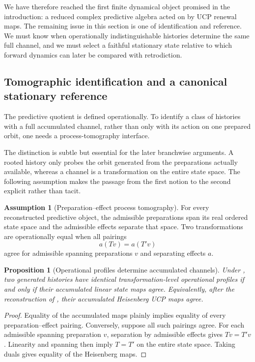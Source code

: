\documentclass[11pt]{article}
\newtheorem{proposition}[theorem]{Proposition}
\theoremstyle{definition}
\newtheorem{assumption}{Assumption}[section]
\theoremstyle{remark}
\begin{document}
We have therefore reached the first finite dynamical object promised in the
introduction: a reduced complex predictive algebra acted on by UCP renewal maps.
The remaining issue in this section is one of identification and reference.  We
must know when operationally indistinguishable histories determine the same full
channel, and we must select a faithful stationary state relative to which forward
dynamics can later be compared with retrodiction.

\subsection{Tomographic identification and a canonical stationary reference}

The predictive quotient is defined operationally.  To identify a class of
histories with a full accumulated channel, rather than only with its action on
one prepared orbit, one needs a process-tomography interface.

The distinction is subtle but essential for the later branchwise arguments.  A
rooted history only probes the orbit generated from the preparations actually
available, whereas a channel is a transformation on the entire state space.  The
following assumption makes the passage from the first notion to the second
explicit rather than tacit.

\begin{assumption}[Preparation--effect process tomography]
\label{ass:process-tomography}
For every reconstructed predictive object, the admissible preparations span
its real ordered state space and the admissible effects separate that space.
Two transformations are operationally equal when all pairings
\[
 a(Tv)=a(T'v)
\]
agree for admissible spanning preparations $v$ and separating effects $a$.
\end{assumption}

\begin{proposition}[Operational profiles determine accumulated channels]
\label{prop:tomographic-channel-equality}
Under , two generated histories have identical
transformation-level operational profiles if and only if their accumulated
linear state maps agree.  Equivalently, after the reconstruction of
, their accumulated Heisenberg
UCP maps agree.
\end{proposition}

\begin{proof}
Equality of the accumulated maps plainly implies equality of every
preparation--effect pairing.  Conversely, suppose all such pairings agree.
For each admissible spanning preparation $v$, separation by admissible effects
gives $Tv=T'v$.  Linearity and spanning then imply $T=T'$ on the entire state
space.  Taking duals gives equality of the Heisenberg maps.
\end{proof}
\end{document}
